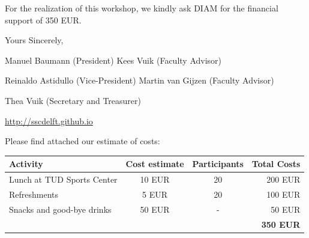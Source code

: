 \documentclass[a4paper,10pt]{article}
\begin{document}


\bigskip
\noindent For the realization of this workshop, we kindly ask DIAM for the financial support of 350 EUR.

\bigskip
\noindent Yours Sincerely,

\bigskip 
\bigskip

\noindent Manuel Baumann (President) \hfill Kees Vuik (Faculty Advisor)

\noindent Reinaldo Astidullo (Vice-President) \hfill Martin van Gijzen (Faculty Advisor)

\noindent Thea Vuik (Secretary and Treasurer)

\noindent \url{http://sscdelft.github.io}

\bigskip

\noindent Please find attached our estimate of costs:
\begin{table}[h]
\centering
\begin{tabular}{lccr}
 Activity & Cost estimate & Participants & Total Costs  \\
 \hline
 Lunch at TUD Sports Center & 10 EUR  & 20  & 200 EUR   \\
 Refreshments & 5 EUR & 20 & 100 EUR \\
 Snacks and good-bye drinks & 50 EUR & -  & 50 EUR   \\
 & & & \textbf{350 EUR}
\end{tabular}
\end{table}
\end{document}
